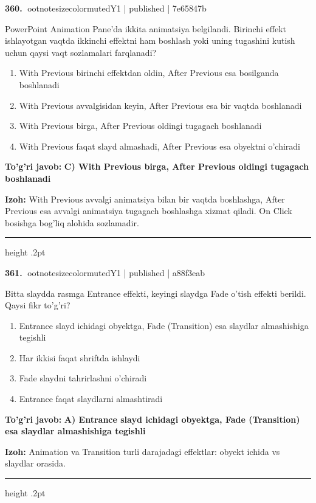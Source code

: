 \documentclass[10pt,a4paper]{article}
\begin{document}
\textbf{\color{ink}360.} {ootnotesizecolor{muted}Y1 | published | 7e65847b}
\par
PowerPoint Animation Pane'da ikkita animatsiya belgilandi. Birinchi effekt ishlayotgan vaqtda ikkinchi effektni ham boshlash yoki uning tugashini kutish uchun qaysi vaqt sozlamalari farqlanadi?
\begin{enumerate}[label=\Alph*),leftmargin=9mm]
\item With Previous birinchi effektdan oldin, After Previous esa bosilganda boshlanadi
\item With Previous avvalgisidan keyin, After Previous esa bir vaqtda boshlanadi
\item With Previous birga, After Previous oldingi tugagach boshlanadi
\item With Previous faqat slayd almashadi, After Previous esa obyektni o'chiradi
\end{enumerate}
\begin{tcolorbox}[enhanced,breakable,colback=teal!4,colframe=teal!55!black,boxrule=0.45pt,arc=1.2mm,left=2.8mm,right=2.8mm,top=2mm,bottom=2mm]
\textbf{\color{teal}To'g'ri javob:} \textbf{C) With Previous birga, After Previous oldingi tugagach boshlanadi}
\par\smallskip
\textbf{Izoh:} With Previous avvalgi animatsiya bilan bir vaqtda boshlashga, After Previous esa avvalgi animatsiya tugagach boshlashga xizmat qiladi. On Click bosishga bog'liq alohida sozlamadir.
\end{tcolorbox}
\vspace{2mm}\hrule height .2pt\vspace{2mm}

\textbf{\color{ink}361.} {ootnotesizecolor{muted}Y1 | published | a88f3eab}
\par
Bitta slaydda rasmga Entrance effekti, keyingi slaydga Fade o'tish effekti berildi. Qaysi fikr to'g'ri?
\begin{enumerate}[label=\Alph*),leftmargin=9mm]
\item Entrance slayd ichidagi obyektga, Fade (Transition) esa slaydlar almashishiga tegishli
\item Har ikkisi faqat shriftda ishlaydi
\item Fade slaydni tahrirlashni o'chiradi
\item Entrance faqat slaydlarni almashtiradi
\end{enumerate}
\begin{tcolorbox}[enhanced,breakable,colback=teal!4,colframe=teal!55!black,boxrule=0.45pt,arc=1.2mm,left=2.8mm,right=2.8mm,top=2mm,bottom=2mm]
\textbf{\color{teal}To'g'ri javob:} \textbf{A) Entrance slayd ichidagi obyektga, Fade (Transition) esa slaydlar almashishiga tegishli}
\par\smallskip
\textbf{Izoh:} Animation va Transition turli darajadagi effektlar: obyekt ichida vs slaydlar orasida.
\end{tcolorbox}
\vspace{2mm}\hrule height .2pt\vspace{2mm}
\end{document}
